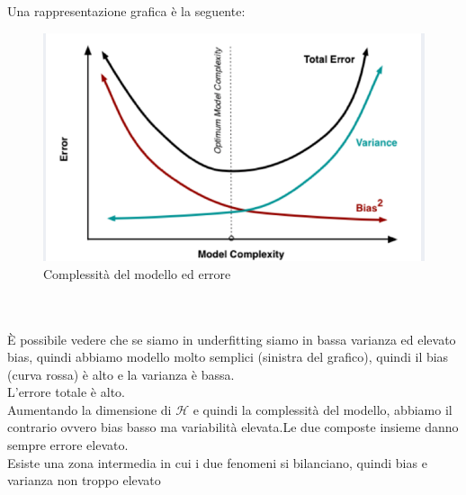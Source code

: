 \documentclass[12pt, oneside]{extbook}
\begin{document}
Una rappresentazione grafica è la seguente:\\
\begin{figure}
	\includegraphics[scale=0.7]{immagini/err_complex.png}
	\caption{Complessità del modello ed errore}
\end{figure}\\\\
È possibile vedere che se siamo in underfitting siamo in bassa varianza ed elevato bias, quindi abbiamo modello molto semplici (sinistra del grafico), quindi il bias (curva rossa) è alto e la varianza è bassa.\\L'errore totale è alto.\\Aumentando la dimensione di $\mathscr{H}$ e quindi la complessità del modello, abbiamo il contrario ovvero bias basso ma variabilità elevata.Le due composte insieme danno sempre errore elevato.\\Esiste una zona intermedia in cui i due fenomeni si bilanciano, quindi bias e varianza non troppo elevato
\end{document}
